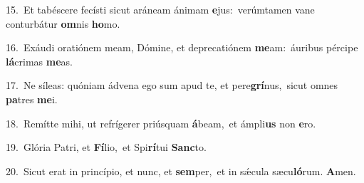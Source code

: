 {\numbfont\textcolor{\numbcolor}{15.}}~Et tabéscere fecísti sicut aráneam ánimam \textbf{e}\-jus:~\star verúmtamen vane conturbátur \textbf{om}\-nis \textbf{ho}\-mo.\par
{\numbfont\textcolor{\numbcolor}{16.}}~Exáudi oratiónem meam, Dómine, et deprecatiónem \textbf{me}\-am:~\star áuribus pércipe \textbf{lá}\-crimas \textbf{me}\-as.\par
{\numbfont\textcolor{\numbcolor}{17.}}~Ne síleas: quóniam ádvena ego sum apud te, et pere\-\textbf{grí}\-nus,~\star sicut omnes \textbf{pa}\-tres \textbf{me}\-i.\par
{\numbfont\textcolor{\numbcolor}{18.}}~Remítte mihi, ut refrígerer priúsquam \textbf{á}\-beam,~\star et ámpli\textbf{us} non \textbf{e}\-ro.\par
{\numbfont\textcolor{\numbcolor}{19.}}~Glória Patri, et \textbf{Fí}\-lio,~\star et Spi\-\textbf{rí}\-tui \textbf{Sanc}\-to.\par
{\numbfont\textcolor{\numbcolor}{20.}}~Sicut erat in princípio, et nunc, et \textbf{sem}\-per,~\star et in sǽcula sæcu\-\textbf{ló}\-rum. \textbf{A}\-men.\par
